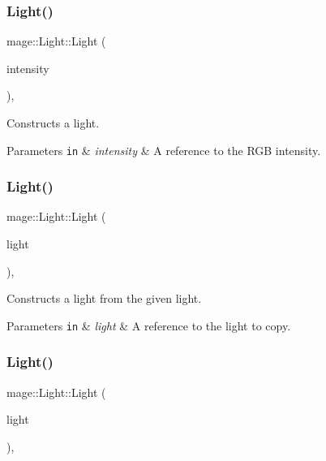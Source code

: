 \subsubsection{\texorpdfstring{Light()}{Light()}\hspace{0.1cm}{\footnotesize\ttfamily [2/4]}}
{\footnotesize\ttfamily mage\+::\+Light\+::\+Light (\begin{DoxyParamCaption}\item[{\hyperlink{structmage_1_1_r_g_b_spectrum}{R\+G\+B\+Spectrum} \&\&}]{intensity }\end{DoxyParamCaption})\hspace{0.3cm}{\ttfamily [explicit]}, {\ttfamily [protected]}}

Constructs a light.


\begin{DoxyParams}[1]{Parameters}
\mbox{\tt in}  & {\em intensity} & A reference to the R\+GB intensity. \\
\hline
\end{DoxyParams}
\hypertarget{classmage_1_1_light_aa91ba3fde50487939d99252c73f732cc}{}\label{classmage_1_1_light_aa91ba3fde50487939d99252c73f732cc} 
\subsubsection{\texorpdfstring{Light()}{Light()}\hspace{0.1cm}{\footnotesize\ttfamily [3/4]}}
{\footnotesize\ttfamily mage\+::\+Light\+::\+Light (\begin{DoxyParamCaption}\item[{const \hyperlink{classmage_1_1_light}{Light} \&}]{light }\end{DoxyParamCaption})\hspace{0.3cm}{\ttfamily [protected]}, {\ttfamily [default]}}

Constructs a light from the given light.


\begin{DoxyParams}[1]{Parameters}
\mbox{\tt in}  & {\em light} & A reference to the light to copy. \\
\hline
\end{DoxyParams}
\hypertarget{classmage_1_1_light_a75343c11264fa27c4f166caaf0fec880}{}\label{classmage_1_1_light_a75343c11264fa27c4f166caaf0fec880} 
\subsubsection{\texorpdfstring{Light()}{Light()}\hspace{0.1cm}{\footnotesize\ttfamily [4/4]}}
{\footnotesize\ttfamily mage\+::\+Light\+::\+Light (\begin{DoxyParamCaption}\item[{\hyperlink{classmage_1_1_light}{Light} \&\&}]{light }\end{DoxyParamCaption})\hspace{0.3cm}{\ttfamily [protected]}, {\ttfamily [default]}}

